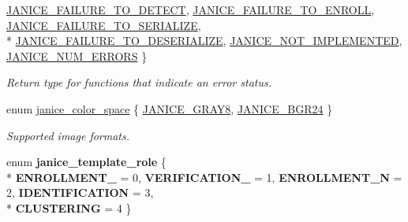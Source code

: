 \begin{DoxyCompactItemize}
\hyperlink{group__janice_gga4873d49c1f9d6a6880dfbd485cf6ba72a4123e451be0cc17446e73331a5886749}{J\+A\+N\+I\+C\+E\+\_\+\+F\+A\+I\+L\+U\+R\+E\+\_\+\+T\+O\+\_\+\+D\+E\+T\+E\+C\+T}, 
\hyperlink{group__janice_gga4873d49c1f9d6a6880dfbd485cf6ba72ad318d25055b2f4457f326c7243f87983}{J\+A\+N\+I\+C\+E\+\_\+\+F\+A\+I\+L\+U\+R\+E\+\_\+\+T\+O\+\_\+\+E\+N\+R\+O\+L\+L}, 
\hyperlink{group__janice_gga4873d49c1f9d6a6880dfbd485cf6ba72a25bc0e0d4d0163a02591d716d758f654}{J\+A\+N\+I\+C\+E\+\_\+\+F\+A\+I\+L\+U\+R\+E\+\_\+\+T\+O\+\_\+\+S\+E\+R\+I\+A\+L\+I\+Z\+E}, 
\\*
\hyperlink{group__janice_gga4873d49c1f9d6a6880dfbd485cf6ba72a8cd2cd3dea07b876b79e5edb8dddda22}{J\+A\+N\+I\+C\+E\+\_\+\+F\+A\+I\+L\+U\+R\+E\+\_\+\+T\+O\+\_\+\+D\+E\+S\+E\+R\+I\+A\+L\+I\+Z\+E}, 
\hyperlink{group__janice_gga4873d49c1f9d6a6880dfbd485cf6ba72a8f3eea0e95a4ef4292306bf370a82b7e}{J\+A\+N\+I\+C\+E\+\_\+\+N\+O\+T\+\_\+\+I\+M\+P\+L\+E\+M\+E\+N\+T\+E\+D}, 
\hyperlink{group__janice_gga4873d49c1f9d6a6880dfbd485cf6ba72a6a81ece74f71417fcdb5ad558b57dcbb}{J\+A\+N\+I\+C\+E\+\_\+\+N\+U\+M\+\_\+\+E\+R\+R\+O\+R\+S}
 \}\begin{DoxyCompactList}\small\item\em Return type for functions that indicate an error status. \end{DoxyCompactList}
\item 
enum \hyperlink{group__janice_ga4040c8aa81857fc2102f27cf34cd973e}{janice\+\_\+color\+\_\+space} \{ \hyperlink{group__janice_gga4040c8aa81857fc2102f27cf34cd973eacd24e66ad3d44f6e65ba0e1d55719d7b}{J\+A\+N\+I\+C\+E\+\_\+\+G\+R\+A\+Y8}, 
\hyperlink{group__janice_gga4040c8aa81857fc2102f27cf34cd973ea45503c486c3f4d472d838e5d8ba9e4f4}{J\+A\+N\+I\+C\+E\+\_\+\+B\+G\+R24}
 \}\begin{DoxyCompactList}\small\item\em Supported image formats. \end{DoxyCompactList}
\item 
\hypertarget{group__janice_gafbbbe427de6327706deba13b7d4e6fcc}{}enum {\bfseries janice\+\_\+template\+\_\+role} \{ \\*
{\bfseries E\+N\+R\+O\+L\+L\+M\+E\+N\+T\+\_} = 0, 
{\bfseries V\+E\+R\+I\+F\+I\+C\+A\+T\+I\+O\+N\+\_} = 1, 
{\bfseries E\+N\+R\+O\+L\+L\+M\+E\+N\+T\+\_\+N} = 2, 
{\bfseries I\+D\+E\+N\+T\+I\+F\+I\+C\+A\+T\+I\+O\+N} = 3, 
\\*
{\bfseries C\+L\+U\+S\+T\+E\+R\+I\+N\+G} = 4
 \}\label{group__janice_gafbbbe427de6327706deba13b7d4e6fcc}

\end{DoxyCompactItemize}
